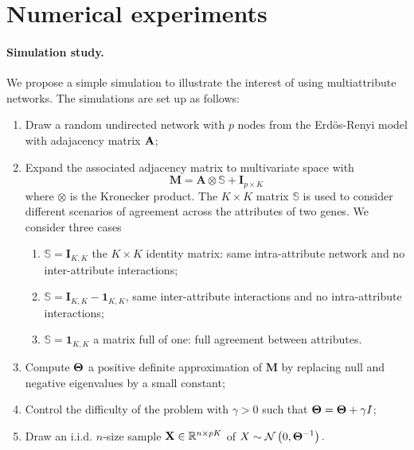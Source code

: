 \section{Numerical  experiments}

\paragraph*{Simulation study.} We propose a simple simulation to
illustrate the interest of using multiattribute networks.  The
simulations are set up as follows:
\begin{enumerate}
\item  Draw  a random  undirected  network  with  $p$ nodes  from  the
  Erd\"os-Renyi model with adajacency matrix $\mathbf{A}$;
\item  Expand the  associated adjacency  matrix to  multivariate space
  with
  $$\mathbf{M} = \mathbf{A}  \otimes \mathbb{S} + \mathbf{I}_{p\times K}$$
  where $\otimes$ is the Kronecker product. The $K\times K$ matrix
  $\mathbb{S}$ is used to consider different scenarios of agreement
  across the attributes of two genes. We consider three cases
  \begin{enumerate}
  \item $\mathbb{S} = \mathbf{I}_{K,K}$ the $K\times K$ identity
    matrix: same intra-attribute network and no inter-attribute
    interactions;
  \item $\mathbb{S} = \mathbf{I}_{K,K} - \mathbf{1}_{K,K}$, same
    inter-attribute interactions and no intra-attribute interactions;
  \item $\mathbb{S} = \mathbf{1}_{K,K}$ a matrix full of one: full
    agreement between  attributes.
  \end{enumerate}
\item Compute $\boldsymbol\Theta$ a positive definite approximation of
  $\mathbf{M}$ by replacing null and negative eigenvalues by a small constant;
\item Control the difficulty of  the problem with $\gamma>0$ such that
  $\boldsymbol\Theta= \boldsymbol\Theta+ \gamma I$;
\item Draw an i.i.d. $n$-size sample $\mathbf{X}\in\mathbb{R}^{n\times pK}$ of
  $X \sim \mathcal{N} \left( 0,\boldsymbol\Theta^{-1} \right) .$
\end{enumerate}

